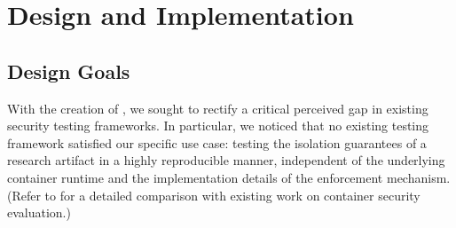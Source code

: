 \section{Design and Implementation}
\label{sec:design}

\subsection{Design Goals}

With the creation of \houdini, we sought to rectify a critical perceived gap in existing
security testing frameworks. In particular, we noticed that no existing testing framework
satisfied our specific use case: testing the isolation guarantees of a research artifact
in a highly reproducible manner, independent of the underlying container runtime and the
implementation details of the enforcement mechanism. (Refer to  for
a detailed comparison with existing work on container security evaluation.)

